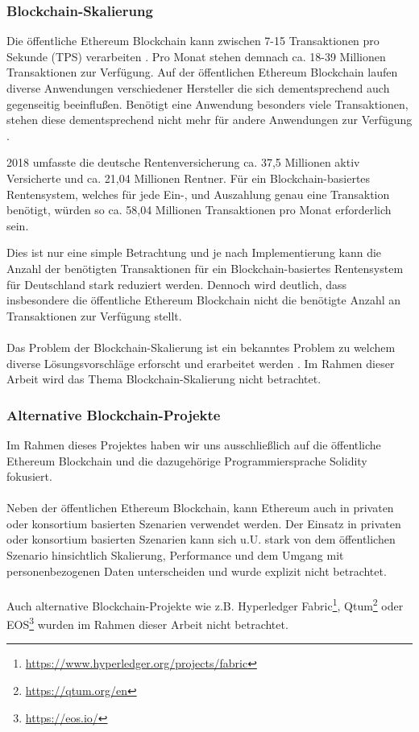 \subsubsection{Blockchain-Skalierung}
Die öffentliche Ethereum Blockchain kann zwischen 7-15 Transaktionen pro Sekunde (TPS) verarbeiten \cite{vitalikscale}. Pro Monat stehen demnach ca. 18-39 Millionen Transaktionen zur Verfügung. Auf der öffentlichen Ethereum Blockchain laufen diverse Anwendungen verschiedener Hersteller die sich dementsprechend auch gegenseitig beeinflußen. Benötigt eine Anwendung besonders viele Transaktionen, stehen diese dementsprechend nicht mehr für andere Anwendungen zur Verfügung \cite{cryptokitty}.  

2018 umfasste die deutsche Rentenversicherung ca. 37,5 Millionen aktiv Versicherte und ca. 21,04 Millionen Rentner. \cite{rente2018,rentezahlen2019} Für ein Blockchain-basiertes Rentensystem, welches für jede Ein-, und Auszahlung genau eine Transaktion benötigt, würden so ca. 58,04 Millionen Transaktionen pro Monat erforderlich sein.

Dies ist nur eine simple Betrachtung und je nach Implementierung kann die Anzahl der benötigten Transaktionen für ein Blockchain-basiertes Rentensystem für Deutschland stark reduziert werden. Dennoch wird deutlich, dass insbesondere die öffentliche Ethereum Blockchain nicht die benötigte Anzahl an Transaktionen zur Verfügung stellt.

\paragraph*{}
Das Problem der Blockchain-Skalierung ist ein bekanntes Problem zu welchem diverse Lösungsvorschläge erforscht und erarbeitet werden \cite{scaling}. Im Rahmen dieser Arbeit wird das Thema Blockchain-Skalierung nicht betrachtet.

\subsubsection{Alternative Blockchain-Projekte}
Im Rahmen dieses Projektes haben wir uns ausschließlich auf die öffentliche Ethereum Blockchain und die dazugehörige Programmiersprache Solidity fokusiert.

\paragraph*{}
Neben der öffentlichen Ethereum Blockchain, kann Ethereum auch in privaten oder konsortium basierten Szenarien verwendet werden. Der Einsatz in privaten oder konsortium basierten Szenarien kann sich u.U. stark von dem öffentlichen Szenario hinsichtlich Skalierung, Performance und dem Umgang mit personenbezogenen Daten unterscheiden und wurde explizit nicht betrachtet.

\paragraph*{}
Auch alternative Blockchain-Projekte wie z.B. 
Hyperledger Fabric\footnote{\url{https://www.hyperledger.org/projects/fabric}}, 
Qtum\footnote{\url{https://qtum.org/en}}
oder EOS\footnote{\url{https://eos.io/}}
wurden im Rahmen dieser Arbeit nicht betrachtet. 